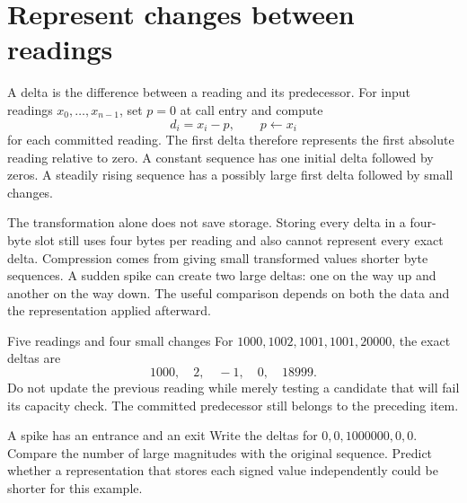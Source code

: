 \section{Represent changes between readings}
A delta is the difference between a reading and its predecessor. For input readings
\(x_0,\ldots,x_{n-1}\), set \(p=0\) at call entry and compute
\[
  d_i=x_i-p,\qquad p\gets x_i
\]
for each committed reading. The first delta therefore represents the first absolute
reading relative to zero. A constant sequence has one initial delta followed by zeros.
A steadily rising sequence has a possibly large first delta followed by small changes.

The transformation alone does not save storage. Storing every delta in a four-byte
slot still uses four bytes per reading and also cannot represent every exact delta.
Compression comes from giving small transformed values shorter byte sequences. A sudden
spike can create two large deltas: one on the way up and another on the way down.
The useful comparison depends on both the data and the representation applied afterward.

\begin{MARSWorkedExample}{Five readings and four small changes}
  For \(1000,1002,1001,1001,20000\), the exact deltas are
  \[
    1000,\quad2,\quad-1,\quad0,\quad18999.
  \]
  Do not update the previous reading while merely testing a candidate that will fail
  its capacity check. The committed predecessor still belongs to the preceding item.
\end{MARSWorkedExample}

\begin{MARSExercise}{A spike has an entrance and an exit}
  Write the deltas for \(0,0,1000000,0,0\). Compare the number of large magnitudes with
  the original sequence. Predict whether a representation that stores each signed value
  independently could be shorter for this example.
\end{MARSExercise}
